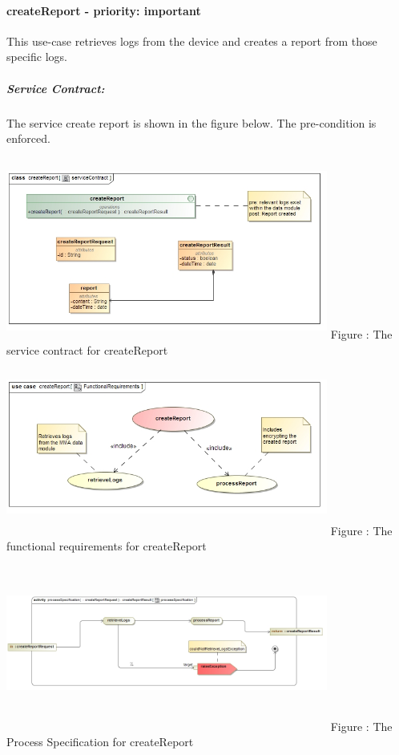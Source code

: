 \documentclass[hidelinks, 12pt, oneside]{article}
\begin{document}
		\paragraph{ createReport - priority: important}
		This use-case retrieves logs from the device and creates a report from those specific logs.\\
		\subparagraph{Service Contract:}
					The service create report is shown in the figure below. The pre-condition is enforced.  \\\\
				\includegraphics[width=400px,height=220px]{img/serviceContractcreateReport.jpg}
					Figure : The service contract for createReport\newline
				\includegraphics[width=400px,height=220px]{img/FunctionalRequirementscreateReport.jpg}
					Figure : The functional requirements for createReport \newline
				\includegraphics[width=400px,height=220px]{img/processSpecificationcreateReport.jpg}
								Figure : The Process Specification for createReport\newline
								
\end{document}
